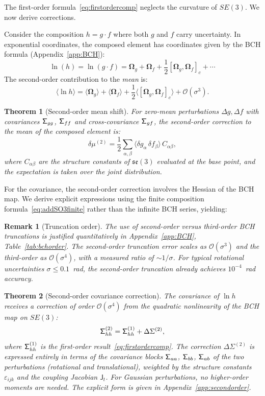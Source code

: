 \documentclass[journal]{IEEEtran}
\newcommand{\bfOmega}{\boldsymbol{\Omega}}
\newcommand{\sfSigma}[1]{\mathsf{\Sigma}_\mathnormal{#1}}
\newcommand{\beq}{\begin{equation}}
\newcommand{\eeq}{\end{equation}}
\newtheorem{theorem}{Theorem}
\newtheorem{remark}{Remark}
\begin{document}
The first-order formula~\eqref{eq:firstordercomp} neglects 
the curvature of $SE(3)$. We now derive corrections.

Consider the composition $h = g \cdot f$ where both 
$g$ and $f$ carry uncertainty. In exponential coordinates, 
the composed element has coordinates given by the 
BCH formula (Appendix~\ref{app:BCH}):
\beq
    \ln(h) = \ln(g \cdot f) = 
    \bfOmega_g + \bfOmega_f + 
    \frac{1}{2}[\bfOmega_g, \bfOmega_f]_c + \cdots
\eeq
The second-order contribution to the \emph{mean} is:
\beq
    \langle \ln h \rangle = 
    \langle \bfOmega_g \rangle + \langle \bfOmega_f \rangle +
    \frac{1}{2} \langle [\bfOmega_g, \bfOmega_f]_c \rangle + 
    \mathcal{O}(\sigma^3).
    \label{eq:secondordermean}
\eeq

\begin{theorem}[Second-order mean shift]
\label{thm:meanshift}
For zero-mean perturbations $\Delta g, \Delta f$ with 
covariances $\sfSigma{gg}$, $\sfSigma{ff}$ and 
cross-covariance $\sfSigma{gf}$, the second-order 
correction to the mean of the composed element is:
\beq
    \delta\mu^{(2)} = \frac{1}{2}
    \sum_{\alpha,\beta} \langle \delta g_\alpha \, \delta f_\beta \rangle\,
    C_{\alpha\beta},
    \label{eq:meancorrection}
\eeq
where $C_{\alpha\beta}$ are the structure constants 
of $\mathfrak{se}(3)$ evaluated at the base point, 
and the expectation is taken over the joint distribution.
\end{theorem}

For the covariance, the second-order correction involves 
the Hessian of the BCH map. We derive explicit expressions 
using the finite composition formula~\eqref{eq:addSO3finite} 
rather than the infinite BCH series, yielding:

\begin{remark}[Truncation order]
The use of second-order versus third-order BCH truncations
is justified quantitatively in Appendix~\ref{app:BCH},
Table~\ref{tab:bchorder}. The second-order truncation
error scales as $\mathcal{O}(\sigma^3)$ and the third-order
as $\mathcal{O}(\sigma^4)$, with a measured ratio of
$\sim 1/\sigma$. For typical rotational uncertainties
$\sigma \leq 0.1$~rad, the second-order truncation
already achieves $10^{-4}$~rad accuracy.
\end{remark}

\begin{theorem}[Second-order covariance correction]
\label{thm:covcorrection}
The covariance of $\ln h$ receives a correction of order 
$\mathcal{O}(\sigma^4)$ from the quadratic nonlinearity 
of the BCH map on $SE(3)$:
\beq
    \sfSigma{hh}^{(2)} = \sfSigma{hh}^{(1)} + 
    \Delta\Sigma^{(2)},
\eeq
where $\sfSigma{hh}^{(1)}$ is the first-order 
result~\eqref{eq:firstordercomp}. The correction 
$\Delta\Sigma^{(2)}$ is expressed entirely in terms of 
the covariance blocks $\sfSigma{aa}$, $\sfSigma{bb}$, 
$\sfSigma{ab}$ of the two perturbations (rotational and 
translational), weighted by the structure constants 
$\varepsilon_{ijk}$ and the coupling Jacobian 
$\mathsf{J}_t$. For Gaussian perturbations, no 
higher-order moments are needed.
The explicit form is given in Appendix~\ref{app:secondorder}.
\end{theorem}
\end{document}
